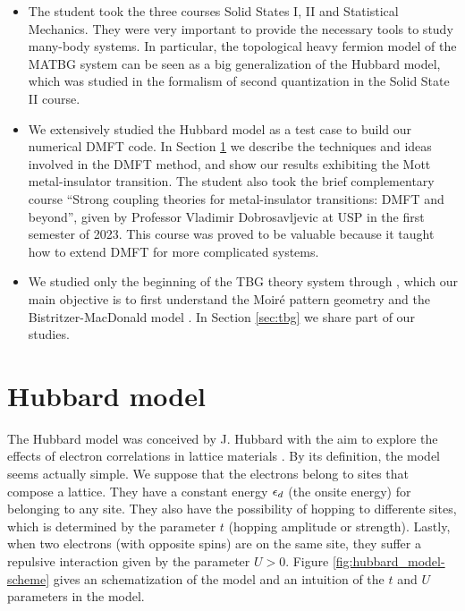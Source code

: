 \documentclass[12pt]{report}
\begin{document}
\begin{itemize}
\item The student took the three courses Solid States I, II and Statistical Mechanics. They were very important to provide the necessary tools to study many-body systems. In particular, the topological heavy fermion model \cite{topoheavyfermion2022} of the MATBG system can be seen as a big generalization of the Hubbard model, which was studied in the formalism of second quantization in the Solid State II course.

\item We extensively studied the Hubbard model \cite{hubbard1963} as a test case to build our numerical DMFT code. In Section \ref{sec:hubbard} we describe the techniques and ideas involved in the DMFT method, and show our results exhibiting the Mott metal-insulator transition. The student also took the brief complementary course ``Strong coupling theories for metal-insulator transitions: DMFT and beyond'', given by Professor Vladimir Dobrosavljevic at USP in the first semester of 2023. This course was proved to be valuable because it taught how to extend DMFT for more complicated systems.

\item We studied only the beginning of the TBG theory system through \cite{handbook2019}, which our main objective is to first understand the Moiré pattern geometry and the Bistritzer-MacDonald model \cite{macdonald2011}. In Section \ref{sec:tbg} we share part of our studies.
\end{itemize}


\section{Hubbard model} \label{sec:hubbard}


The Hubbard model was conceived by J. Hubbard with the aim to explore the effects of electron correlations in lattice materials \cite{hubbard1963}. By its definition, the model seems actually simple. We suppose that the electrons belong to sites that compose a lattice. They have a constant energy $\epsilon_d$ (the onsite energy) for belonging to any site. They also have the possibility of hopping to differente sites, which is determined by the parameter $t$ (hopping amplitude or strength). Lastly, when two electrons (with opposite spins) are on the same site, they suffer a repulsive interaction given by the parameter $U > 0$. Figure \ref{fig:hubbard_model-scheme} gives an schematization of the model and an intuition of the $t$ and $U$ parameters in the model.
\end{document}
